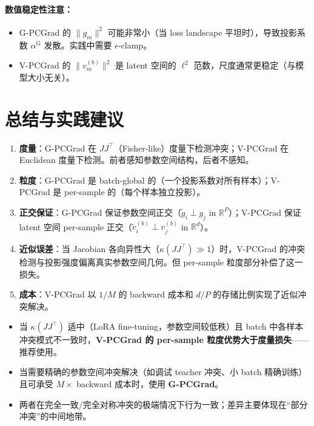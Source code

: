 \documentclass[11pt,a4paper]{article}
\newcommand{\R}{\mathbb{R}}
\theoremstyle{definition}
\begin{document}
\paragraph{数值稳定性注意：}
\begin{itemize}
\item G-PCGrad 的 $\|g_m\|^2$ 可能非常小（当 loss landscape 平坦时），导致投影系数 $\alpha^{\mathrm{G}}$ 发散。实践中需要 $\epsilon$-clamp。
\item V-PCGrad 的 $\|v_m^{(b)}\|^2$ 是 latent 空间的 $\ell^2$ 范数，尺度通常更稳定（与模型大小无关）。
\end{itemize}

\section{总结与实践建议}
\label{sec:summary}

\begin{tcolorbox}[colback=yellow!5, colframe=yellow!60!black, title=核心差异总结]
\begin{enumerate}[leftmargin=1.5em]
\item \textbf{度量}：G-PCGrad 在 $JJ^\top$（Fisher-like）度量下检测冲突；V-PCGrad 在 Euclidean 度量下检测。前者感知参数空间结构，后者不感知。

\item \textbf{粒度}：G-PCGrad 是 batch-global 的（一个投影系数对所有样本）；V-PCGrad 是 per-sample 的（每个样本独立投影）。

\item \textbf{正交保证}：G-PCGrad 保证参数空间正交（$\tilde{g}_i \perp g_j$ in $\R^P$）；V-PCGrad 保证 latent 空间 per-sample 正交（$\tilde{v}_i^{(b)} \perp v_j^{(b)}$ in $\R^d$）。

\item \textbf{近似误差}：当 Jacobian 各向异性大（$\kappa(JJ^\top) \gg 1$）时，V-PCGrad 的冲突检测与投影强度偏离真实参数空间几何。但 per-sample 粒度部分补偿了这一损失。

\item \textbf{成本}：V-PCGrad 以 $1/M$ 的 backward 成本和 $d/P$ 的存储比例实现了近似冲突解决。
\end{enumerate}
\end{tcolorbox}

\bigskip

\begin{tcolorbox}[colback=green!5, colframe=green!50!black, title=实践建议]
\begin{itemize}[leftmargin=1em]
\item 当 $\kappa(JJ^\top)$ 适中（LoRA fine-tuning，参数空间较低秩）且 batch 中各样本冲突模式不一致时，\textbf{V-PCGrad 的 per-sample 粒度优势大于度量损失}——推荐使用。
\item 当需要精确的参数空间冲突解决（如调试 teacher 冲突、小 batch 精确训练）且可承受 $M\times$ backward 成本时，使用 \textbf{G-PCGrad}。
\item 两者在完全一致/完全对称冲突的极端情况下行为一致；差异主要体现在``部分冲突''的中间地带。
\end{itemize}
\end{tcolorbox}
\end{document}
